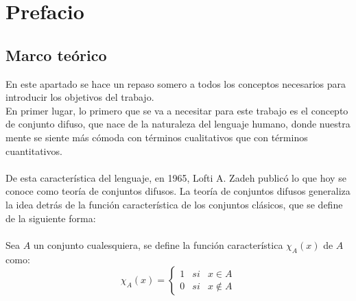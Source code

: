 \chapter{Prefacio}

\section{Marco teórico}
En este apartado se hace un repaso somero a todos los conceptos necesarios para introducir los objetivos del trabajo. \\
En primer lugar, lo primero que se va a necesitar para este trabajo es el concepto de conjunto difuso, que nace de la  naturaleza del lenguaje humano, donde nuestra mente se siente más cómoda con términos cualitativos que con términos cuantitativos.\\ \\
De esta característica del lenguaje, en 1965, Lofti A. Zadeh publicó lo que hoy se conoce como teoría de conjuntos difusos. La teoría de conjuntos difusos generaliza la idea detrás de la función característica de los conjuntos clásicos, que se define de la siguiente forma: \\ \\
Sea $A$ un conjunto cualesquiera, se define la función característica $\chi_A(x)$ de $A$ como:
\[
	\chi_A(x) = \left\{
		\begin{array}{ccc}
			1 & si & x \in A \\
			0 & si & x \notin A
		\end{array}
	\right.
\]


